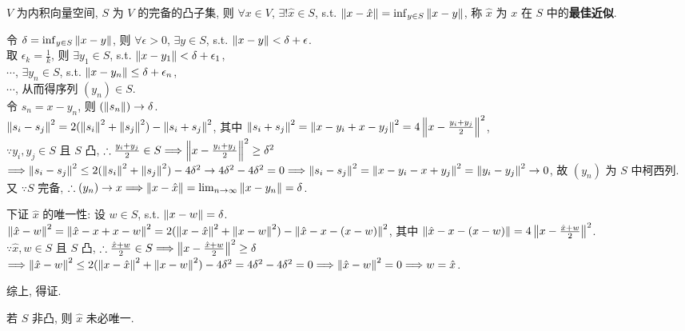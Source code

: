 \documentclass{note}
\begin{document}
\begin{thm}[(课本定理 13.9)]\label{thm-13.9}
    $V$ 为内积向量空间, $S$ 为 $V$ 的完备的凸子集, 则 $\forall x\in V$, $\exists!\hat{x}\in S$, s.t. $\left\lVert x-\hat{x}\right\rVert=\inf_{y\in S}\left\lVert x-y\right\rVert$, 称 $\hat{x}$ 为 $x$ 在 $S$ 中的\textbf{最佳近似}.
\end{thm}
\begin{pf}
    令 $\delta=\inf_{y\in S}\left\lVert x-y\right\rVert$, 则 $\forall\epsilon>0$, $\exists y\in S$, s.t. $\left\lVert x-y\right\rVert<\delta+\epsilon$.\\
    取 $\epsilon_k=\frac{1}{k}$, 则 $\exists y_1\in S$, s.t. $\left\lVert x-y_1\right\rVert<\delta+\epsilon_1$,\\
    $\cdots$, $\exists y_n\in S$, s.t. $\left\lVert x-y_n\right\rVert\leq\delta+\epsilon_n$,\\
    $\cdots$, 从而得序列 $(y_n)\in S$.\\
    令 $s_n=x-y_n$, 则 $(\left\lVert s_n\right\rVert)\rightarrow\delta$.\\
    $\left\lVert s_i-s_j\right\rVert^2=2(\left\lVert s_i\right\rVert^2+\left\lVert s_j\right\rVert^2)-\left\lVert s_i+s_j\right\rVert^2$, 其中 $\left\lVert s_i+s_j\right\rVert^2=\left\lVert x-y_i+x-y_j\right\rVert^2=4\left\lVert x-\frac{y_i+y_j}{2}\right\rVert^2$,\\
    $\because y_i,y_j\in S$ 且 $S$ 凸, $\therefore\frac{y_i+y_j}{2}\in S\Longrightarrow\left\lVert x-\frac{y_i+y_j}{2}\right\rVert^2\geq\delta^2$\\
    $\Longrightarrow\left\lVert s_i-s_j\right\rVert^2\leq 2(\left\lVert s_i\right\rVert^2+\left\lVert s_j\right\rVert^2)-4\delta^2\rightarrow 4\delta^2-4\delta^2=0\Longrightarrow\left\lVert s_i-s_j\right\rVert^2=\left\lVert x-y_i-x+y_j\right\rVert^2=\left\lVert y_i-y_j\right\rVert^2\rightarrow 0$, 故 $(y_n)$ 为 $S$ 中柯西列.\\
    又 $\because S$ 完备, $\therefore(y_n)\rightarrow x\Longrightarrow\left\lVert x-\hat{x}\right\rVert=\lim_{n\rightarrow\infty}\left\lVert x-y_n\right\rVert=\delta$.

    下证 $\hat{x}$ 的唯一性: 设 $w\in S$, s.t. $\left\lVert x-w\right\rVert=\delta$.\\
    $\left\lVert\hat{x}-w\right\rVert^2=\left\lVert\hat{x}-x+x-w\right\rVert^2=2(\left\lVert x-\hat{x}\right\rVert^2+\left\lVert x-w\right\rVert^2)-\left\lVert\hat{x}-x-(x-w)\right\rVert^2$, 其中 $\left\lVert\hat{x}-x-(x-w)\right\rVert=4\left\lVert x-\frac{\hat{x}+w}{2}\right\rVert^2$.\\
    $\because\hat{x},w\in S$ 且 $S$ 凸, $\therefore\frac{\hat{x}+w}{2}\in S\Longrightarrow\left\lVert x-\frac{\hat{x}+w}{2}\right\rVert^2\geq\delta$\\
    $\Longrightarrow\left\lVert\hat{x}-w\right\rVert^2\leq 2(\left\lVert x-\hat{x}\right\rVert^2+\left\lVert x-w\right\rVert^2)-4\delta^2=4\delta^2-4\delta^2=0\Longrightarrow\left\lVert\hat{x}-w\right\rVert^2=0\Longrightarrow w=\hat{x}$.

    综上, 得证.
\end{pf}

若 $S$ 非凸, 则 $\hat{x}$ 未必唯一.
\end{document}
